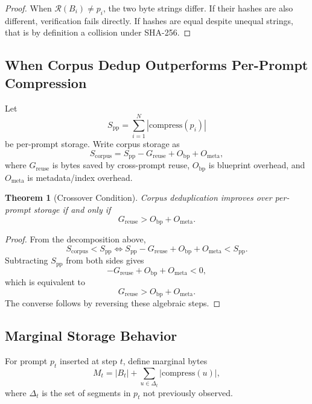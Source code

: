 \documentclass[10pt,conference]{IEEEtran}
\newtheorem{theorem}{Theorem}
\begin{document}
\begin{proof}
When $\mathcal{R}(B_i)\neq p_i$, the two byte strings differ. If their hashes are also different, verification fails directly. If hashes are equal despite unequal strings, that is by definition a collision under SHA-256.
\end{proof}

\subsection{When Corpus Dedup Outperforms Per-Prompt Compression}
Let
\begin{equation}
S_{\text{pp}}=\sum_{i=1}^{N}|\text{compress}(p_i)|
\end{equation}
be per-prompt storage. Write corpus storage as
\begin{equation}
S_{\text{corpus}} = S_{\text{pp}} - G_{\text{reuse}} + O_{\text{bp}} + O_{\text{meta}},
\end{equation}
where $G_{\text{reuse}}$ is bytes saved by cross-prompt reuse, $O_{\text{bp}}$ is blueprint overhead, and $O_{\text{meta}}$ is metadata/index overhead.

\begin{theorem}[Crossover Condition]
Corpus deduplication improves over per-prompt storage if and only if
\begin{equation}
G_{\text{reuse}} > O_{\text{bp}} + O_{\text{meta}}.
\end{equation}
\end{theorem}

\begin{proof}
From the decomposition above,
\begin{equation}
S_{\text{corpus}} < S_{\text{pp}} \iff S_{\text{pp}} - G_{\text{reuse}} + O_{\text{bp}} + O_{\text{meta}} < S_{\text{pp}}.
\end{equation}
Subtracting $S_{\text{pp}}$ from both sides gives
\begin{equation}
-G_{\text{reuse}} + O_{\text{bp}} + O_{\text{meta}} < 0,
\end{equation}
which is equivalent to
\begin{equation}
G_{\text{reuse}} > O_{\text{bp}} + O_{\text{meta}}.
\end{equation}
The converse follows by reversing these algebraic steps.
\end{proof}

\subsection{Marginal Storage Behavior}
For prompt $p_t$ inserted at step $t$, define marginal bytes
\begin{equation}
M_t = |B_t| + \sum_{u\in \Delta_t}|\text{compress}(u)|,
\end{equation}
where $\Delta_t$ is the set of segments in $p_t$ not previously observed.
\end{document}
